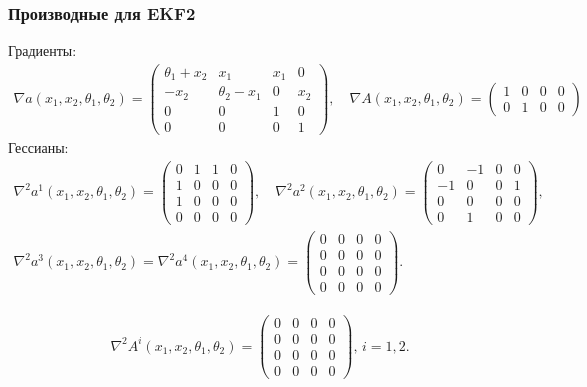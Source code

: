 \documentclass[a4paper,12pt]{article}
\begin{document}
\subsubsection{Производные для EKF2}
Градиенты:
\begin{gather*}
    \nabla a(x_1, x_2, \theta_1, \theta_2) = 
        \begin{pmatrix}
            \theta_1 + x_2 & x_1 & x_1 & 0 \\
            -x_2 &\theta_2 - x_1 & 0 & x_2 \\
            0 & 0 & 1 & 0 \\
            0 & 0 & 0 & 1 
        \end{pmatrix}, \quad 
    \nabla A(x_1, x_2, \theta_1, \theta_2) = 
    \begin{pmatrix}
        1 & 0 & 0 & 0\\
        0 & 1 & 0 & 0
    \end{pmatrix}
\end{gather*}
Гессианы:
\begin{gather*}
    \nabla^2 a^1(x_1, x_2, \theta_1, \theta_2) = 
        \begin{pmatrix}
            0 &  1 & 1 & 0 \\
            1 &  0 & 0 & 0 \\
            1 &  0 & 0 & 0 \\
            0 &  0 & 0 & 0 
        \end{pmatrix}, \quad
    \nabla^2 a^2(x_1, x_2, \theta_1, \theta_2) = 
        \begin{pmatrix}
             0 & -1 & 0 & 0\\
            -1 &  0 & 0 & 1\\
             0 &  0 & 0 & 0 \\
             0 &  1 & 0 & 0 
        \end{pmatrix}, \\
    \nabla^2 a^3(x_1, x_2, \theta_1, \theta_2) = \nabla^2 a^4(x_1, x_2, \theta_1, \theta_2) =
        \begin{pmatrix}
             0 & 0 & 0 & 0 \\
             0 & 0 & 0 & 0 \\
             0 & 0 & 0 & 0 \\
             0 & 0 & 0 & 0 
        \end{pmatrix}.
\end{gather*}

\begin{gather*}
    \nabla^2 A^i(x_1, x_2, \theta_1, \theta_2) = \begin{pmatrix}
             0 & 0 & 0 & 0 \\
             0 & 0 & 0 & 0 \\
             0 & 0 & 0 & 0 \\
             0 & 0 & 0 & 0 
        \end{pmatrix},\, i = 1, 2.
\end{gather*}
\end{document}

